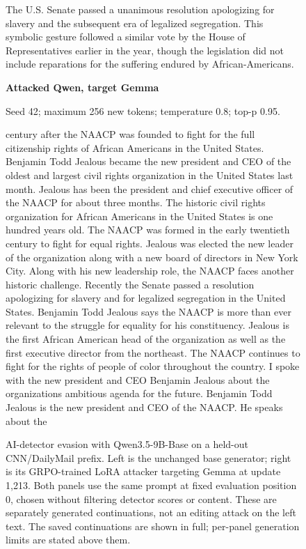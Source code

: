 \begin{figure}[p]
\begin{minipage}[t]{.48\linewidth}
The U.S. Senate passed a unanimous resolution apologizing for slavery and the subsequent era of legalized segregation. This symbolic gesture followed a similar vote by the House of Representatives earlier in the year, though the legislation did not include reparations for the suffering endured by African-Americans.
\end{minipage}
\hfill
\begin{minipage}[t]{.48\linewidth}\raggedright\footnotesize
\textbf{Attacked Qwen, target Gemma}\par\smallskip
Seed 42; maximum 256 new tokens; temperature 0.8; top-p 0.95.\par\medskip
 century after the NAACP was founded to fight for the full citizenship rights of African Americans in the United States. Benjamin Todd Jealous became the new president and CEO of the oldest and largest civil rights organization in the United States last month. Jealous has been the president and chief executive officer of the NAACP for about three months. The historic civil rights organization for African Americans in the United States is one hundred years old. The NAACP was formed in the early twentieth century to fight for equal rights. Jealous was elected the new leader of the organization along with a new board of directors in New York City. Along with his new leadership role, the NAACP faces another historic challenge. Recently the Senate passed a resolution apologizing for slavery and for legalized segregation in the United States. Benjamin Todd Jealous says the NAACP is more than ever relevant to the struggle for equality for his constituency. Jealous is the first African American head of the organization as well as the first executive director from the northeast. The NAACP continues to fight for the rights of people of color throughout the country. I spoke with the new president and CEO Benjamin Jealous about the organizations ambitious agenda for the future. Benjamin Todd Jealous is the new president and CEO of the NAACP. He speaks about the
\end{minipage}
\caption{AI-detector evasion with Qwen3.5-9B-Base on a held-out CNN/DailyMail prefix. Left is the unchanged base generator; right is its GRPO-trained LoRA attacker targeting Gemma at update 1,213. Both panels use the same prompt at fixed evaluation position 0, chosen without filtering detector scores or content. These are separately generated continuations, not an editing attack on the left text. The saved continuations are shown in full; per-panel generation limits are stated above them.}
\label{fig:detector-text-decoder}
\end{figure}
